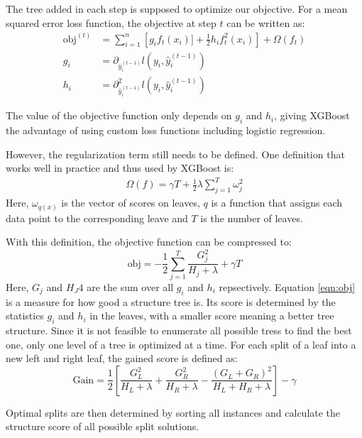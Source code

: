 The tree added in each step is supposed to optimize our objective. For a mean squared error loss function, the objective at step $t$ can be written as:
\begin{align}
  \text{obj}^{(t)} &= \sum_{i=1}^n \left[g_i f_t(x_i)] + \frac{1}{2}h_i f_t^2(x_i)\right] + \Omega(f_t)  \\
  g_i &= \partial_{\hat{y}_i^{(t-1)}} l(y_i, \hat{y}_i^{(t-1)}) \\
  h_i &= \partial^2_{\hat{y}_i^{(t-1)}} l(y_i, \hat{y}_i^{(t-1)})
\end{align}

The value of the objective function only depends on $g_i$ and $h_i$, giving XGBoost the advantage of using custom loss functions including logistic regression.

However, the regularization term still needs to be defined. One definition that works well in practice and thus used by XGBoost is:
\begin{align}
  \Omega (f) = \gamma T + \frac{1}{2}\lambda \sum_{j=1}^T \omega_j^2
\end{align}
Here, $\omega_{q(x)}$ is the vector of scores on leaves, $q$ is a function that assigns each data point to the corresponding leave and $T$ is the number of leaves.

With this definition, the objective function can be compressed to:
\begin{equation} \label{eqn:obj}
  \text{obj} = -\frac{1}{2}\sum_{j=1}^T \frac{G_j^2}{H_j + \lambda} + \gamma T
\end{equation}
Here, $G_j$ and $H_J4$ are the sum over all $g_i$ and $h_i$ repsectively. Equation \ref{eqn:obj} is a measure for how good a structure tree is. Its score
is determined by the statistics $g_i$ and $h_i$ in the leaves, with a smaller score meaning a better tree structure.
Since it is not feasible to enumerate all possible tress to find the best one, only one level of a tree is optimized at a time.
For each split of a leaf into a new left and right leaf, the gained score is defined as:
\begin{equation}
  \text{Gain} = \frac{1}{2}\left[\frac{G_L^2}{H_L + \lambda} + \frac{G_R^2}{H_R + \lambda} - \frac{(G_L + G_R)^2}{H_L+H_R+\lambda}\right] -\gamma
\end{equation}

Optimal splits are then determined by sorting all instances and calculate the structure score of all possible split solutions.

